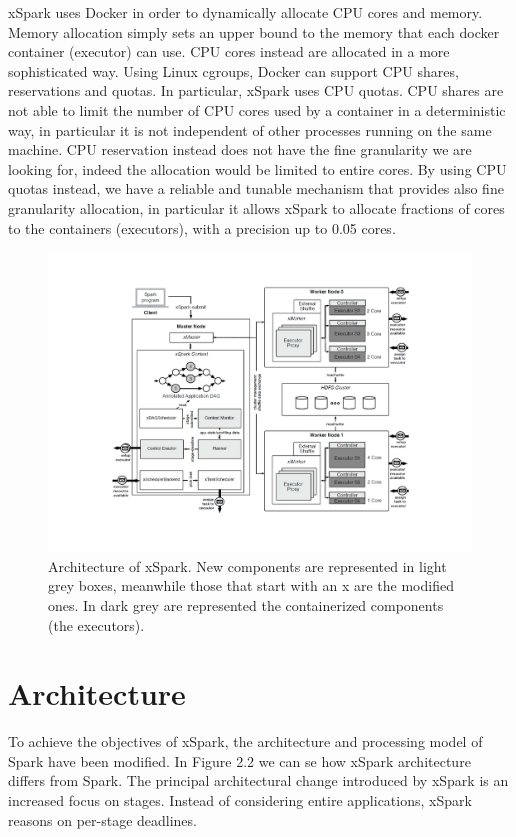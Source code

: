 xSpark uses Docker in order to dynamically allocate CPU cores and memory. Memory allocation simply sets an upper bound to the memory that each docker container (executor) can use. CPU cores instead are allocated in a more sophisticated way.
Using Linux cgroups, Docker can support CPU shares, reservations and quotas. In particular, xSpark uses CPU quotas. CPU shares are not able to limit the number of CPU cores used by a container in a deterministic way, in particular it is not independent of other processes
running on the same machine. CPU reservation instead does not have the fine granularity we are looking for, indeed the allocation would be limited to entire cores. By using CPU quotas instead, we have a reliable and tunable mechanism that provides also fine granularity
allocation, in particular it allows xSpark to allocate fractions of cores
to the containers (executors), with a precision up to 0.05 cores.
\begin{figure}
	\centering
	\includegraphics[width=\columnwidth]{Images/xspark_architecture.pdf}  
	\caption[Architecture of xSpark.]{Architecture of xSpark. New components are represented in light grey boxes, meanwhile those that start with an x are the modified ones. In dark grey are represented the containerized components (the executors).}
	\label{fig:xSparkArchitecture}
\end{figure}
\section{Architecture}\label{sec:architecture}

To achieve the objectives of xSpark, the architecture and processing model of Spark have been modified. In Figure 2.2 we can se how xSpark architecture differs from Spark. The principal architectural change introduced by xSpark is an increased focus on stages. Instead of considering entire applications, xSpark reasons on per-stage deadlines. 

